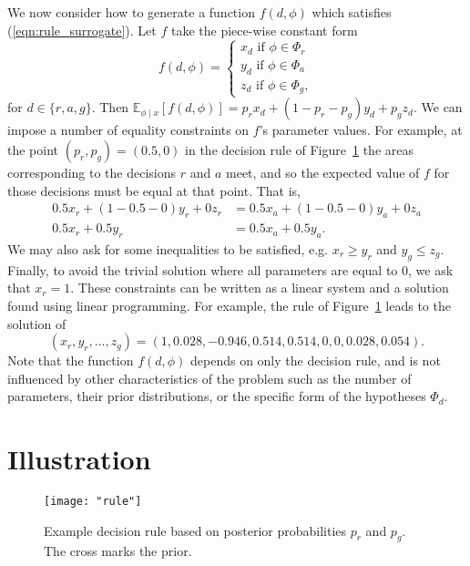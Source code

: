 \documentclass{article} %
\begin{document}
We now consider how to generate a function $f(d, \phi)$ which satisfies (\ref{eqn:rule_surrogate}). Let $f$ take the piece-wise constant form
\[
  f(d, \phi) =\begin{cases}
               x_{d} \text{ if } \phi \in \Phi_{r} \\
               y_{d} \text{ if } \phi \in \Phi_{a} \\
               z_{d} \text{ if } \phi \in \Phi_{g}, 
            \end{cases}
\]
for $d \in \{r, a, g \}$. Then $\mathbb{E}_{\phi \mid x}[f(d, \phi)] = p_{r}x_{d} + (1-p_{r}-p_{g})y_{d} + p_{g}z_{d}$. We can impose a number of equality constraints on $f$'s parameter values. For example, at the point $(p_{r}, p_{g}) = (0.5, 0)$ in the decision rule of Figure~\ref{fig:rule} the areas corresponding to the decisions $r$ and $a$ meet, and so the expected value of $f$ for those decisions must be equal at that point. That is,
\begin{align}
0.5 x_{r} + (1-0.5-0)y_{r} + 0z_{r} &= 0.5 x_{a} + (1-0.5-0)y_{a} + 0z_{a} \\
0.5 x_{r} + 0.5y_{r} &= 0.5x_{a} + 0.5y_{a}.
\end{align}
We may also ask for some inequalities to be satisfied, e.g. $x_{r} \geq y_{r}$ and $y_{g} \leq z_{g}$. Finally, to avoid the trivial solution where all parameters are equal to 0, we ask that $x_{r} = 1$. These constraints can be written as a linear system and a solution found using linear programming. For example, the rule of Figure~\ref{fig:rule} leads to the solution of 
\begin{equation}
(x_{r}, y_{r}, \ldots, z_{g}) = (1, 0.028, -0.946, 0.514, 0.514, 0, 0, 0.028, 0.054).
\end{equation}
Note that the function $f(d, \phi)$ depends on only the decision rule, and is not influenced by other characteristics of the problem such as the number of parameters, their prior distributions, or the specific form of the hypotheses $\Phi_{d}$.

\section{Illustration}

\begin{figure}
\centering
\texttt{[image: "rule"]}
\caption{Example decision rule based on posterior probabilities $p_{r}$ and $p_{g}$. The cross marks the prior.}
\label{fig:rule}
\end{figure}
\end{document}
